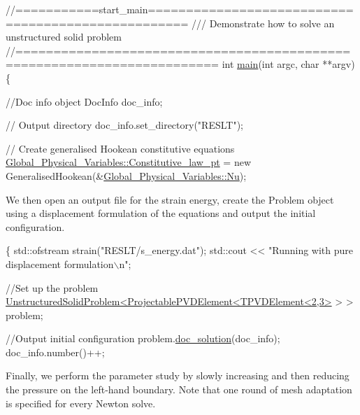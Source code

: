  
\begin{DoxyCodeInclude}
\textcolor{comment}{//===========start\_main===================================================}
\textcolor{comment}{/// Demonstrate how to solve an unstructured solid problem}
\textcolor{comment}{}\textcolor{comment}{//========================================================================}
\textcolor{keywordtype}{int} \hyperlink{unstructured__adaptive__solid_8cc_a3c04138a5bfe5d72780bb7e82a18e627}{main}(\textcolor{keywordtype}{int} argc, \textcolor{keywordtype}{char} **argv)
\{

 \textcolor{comment}{//Doc info object}
 DocInfo doc\_info;

 \textcolor{comment}{// Output directory}
 doc\_info.set\_directory(\textcolor{stringliteral}{"RESLT"});
 
 \textcolor{comment}{// Create generalised Hookean constitutive equations}
 \hyperlink{namespaceGlobal__Physical__Variables_a2a37fb040c832ee7a086bb13bb02a100}{Global\_Physical\_Variables::Constitutive\_law\_pt} = 
  \textcolor{keyword}{new} GeneralisedHookean(&\hyperlink{namespaceGlobal__Physical__Variables_a3962c36313826b19f216f6bbbdd6a477}{Global\_Physical\_Variables::Nu});

\end{DoxyCodeInclude}


We then open an output file for the strain energy, create the {\ttfamily Problem} object using a displacement formulation of the equations and output the initial configuration.


\begin{DoxyCodeInclude}
 
 \{
  std::ofstream strain(\textcolor{stringliteral}{"RESLT/s\_energy.dat"});
  std::cout << \textcolor{stringliteral}{"Running with pure displacement formulation\(\backslash\)n"};

  \textcolor{comment}{//Set up the problem}
  \hyperlink{classUnstructuredSolidProblem}{UnstructuredSolidProblem<ProjectablePVDElement<TPVDElement<2,3>}
       > > problem;
  
  \textcolor{comment}{//Output initial configuration}
  problem.\hyperlink{classUnstructuredSolidProblem_ab3d66fd61b69d12b4f159d763fc44f15}{doc\_solution}(doc\_info);
  doc\_info.number()++;

\end{DoxyCodeInclude}


Finally, we perform the parameter study by slowly increasing and then reducing the pressure on the left-\/hand boundary. Note that one round of mesh adaptation is specified for every Newton solve.


